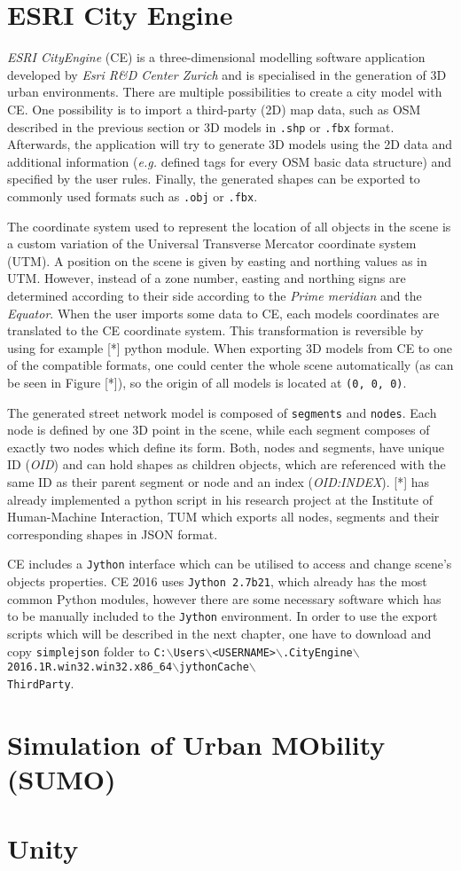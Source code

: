 \section{ESRI City Engine}
\label{ch:ce}
\emph{ESRI CityEngine} (CE) is a three-dimensional modelling software application developed by \emph{Esri R\&D Center Zurich} and is specialised in the generation of 3D urban environments. There are multiple possibilities to create a city model with CE. One possibility is to import a third-party (2D) map data, such as OSM described in the previous section or 3D models in \texttt{.shp} or \texttt{.fbx} format. Afterwards, the application will try to generate 3D models using the 2D data and additional information (\emph{e.g.} defined tags for every OSM basic data structure) and specified by the user rules. Finally, the generated shapes can be exported to commonly used formats such as \texttt{.obj} or \texttt{.fbx}. 

The coordinate system used to represent the location of all objects in the scene is a custom variation of the Universal Transverse Mercator coordinate system (UTM). A position on the scene is given by easting and northing values as in UTM. However, instead of a zone number, easting and northing signs are determined according to their side according to the \emph{Prime meridian} and the \emph{Equator}. When the user imports some data to CE, each models coordinates are translated to the CE coordinate system. This transformation is reversible by using for example [*] python module. When exporting 3D models from CE to one of the compatible formats, one could center the whole scene automatically (as can be seen in Figure [*]), so the origin of all models is located at \texttt{(0, 0, 0)}.

The generated street network model is composed of \texttt{segments} and \texttt{nodes}. Each node is defined by one 3D point in the scene, while each segment composes of exactly two nodes which define its form. Both, nodes and segments, have unique ID (\emph{OID}) and can hold shapes as children objects, which are referenced with the same ID as their parent segment or node and an index (\emph{OID:INDEX}). [*] has already implemented a python script in his research project at the Institute of Human-Machine Interaction, TUM which exports all nodes, segments and their corresponding shapes in JSON format. 

CE includes a \texttt{Jython} interface which can be utilised to access and change scene's objects properties. CE 2016 uses \texttt{Jython 2.7b21},  which already has the most common Python modules, however there are some necessary software which has to be manually included to the \texttt{Jython} environment. In order to use the export scripts which will be described in the next chapter, one have to download and copy \texttt{simplejson} folder to \texttt{C:$\backslash$Users$\backslash$<USERNAME>$\backslash$.CityEngine$\backslash$2016.1R.win32.win32.x86\_64$\backslash$jythonCache$\backslash$\\ThirdParty}.

\section{Simulation of Urban MObility (SUMO)}
\label{ch:sumo}

\section{Unity}
\label{ch:unity}
